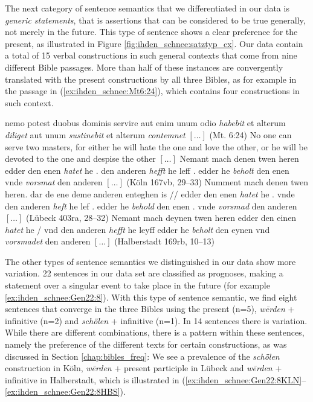 \documentclass[output=paper,colorlinks,citecolor=brown]{langscibook}
\begin{document}
The next category of sentence semantics that we differentiated in our data is \textit{generic statements}, that is assertions that can be considered to be true generally, not merely in the future. This type of sentence shows a clear preference for the present, as illustrated in Figure \ref{fig:ihden_schnee:satztyp_cx}. Our data contain a total of 15 verbal constructions in such general contexts that come from nine different Bible passages. More than half of these instances are convergently translated with the present constructions by all three Bibles, as for example in the passage in (\ref{ex:ihden_schnee:Mt6:24}), which contains four constructions in such context.

\ea nemo potest duobus dominis servire aut enim unum odio \textit{habebit} et alterum \textit{diliget} aut unum \textit{sustinebit} et alterum \textit{contemnet} $[\ldots]$ (Mt. 6:24)\label{ex:ihden_schnee:Mt6:24}
\exi{} No one can serve two masters, for either he will hate the one and love the other, or he will be devoted to the one and despise the other $[\ldots]$
\ea Nemant mach denen twen heren edder den enen \textit{hatet} he . den anderen \textit{hefft} he leff . edder he \textit{beholt} den enen vnde \textit{vorsmat} den anderen $[\ldots]$ (Köln 167vb, 29--33)
\ex Numment mach denen twen heren. dar de ene deme anderen enteghen is // edder den enen \textit{hatet} he . vnde den anderen \textit{heft} he lef . edder he \textit{behold} den enen . vnde \textit{vorsmad} den anderen $[\ldots]$ (Lübeck 403ra, 28--32)
\ex Nemant mach deynen twen heren edder den einen \textit{hatet} he / vnd den anderen \textit{hefft} he leyff edder he \textit{beholt} den eynen vnd \textit{vorsmadet} den anderen $[\ldots]$ (Halberstadt 169rb, 10--13)
\z
\z

The other types of sentence semantics we distinguished in our data show more variation.  
22 sentences in our data set are classified as prognoses, making a statement over a singular event to take place in the future (for example \ref{ex:ihden_schnee:Gen22:8}). With this type of sentence semantic, we find eight sentences that converge in the three Bibles using the present (n=5), \textit{wērden} + infinitive (n=2) and  \textit{schȫlen} + infinitive (n=1). In 14 sentences there is variation. While there are different combinations, there is a pattern within these sentences, namely the preference of the different texts for certain constructions, as was discussed in Section \ref{chap:bibles_freq}: We see a prevalence of the \textit{schȫlen} construction in Köln, \textit{wērden} + present participle in Lübeck and \textit{wērden} + infinitive in Halberstadt, which is illustrated in (\ref{ex:ihden_schnee:Gen22:8KLN}--\ref{ex:ihden_schnee:Gen22:8HBS}).
\end{document}
